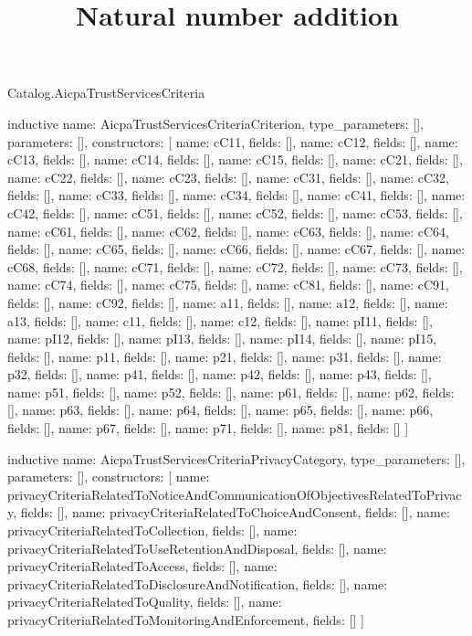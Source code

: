 \begin{lexlean}{Catalog.AicpaTrustServicesCriteria}
\title{Natural number addition}
\begin{semanticmodule}
inductive{
  name: AicpaTrustServicesCriteriaCriterion,
  type_parameters: [],
  parameters: [],
  constructors: [
    {name: cC11, fields: []},
    {name: cC12, fields: []},
    {name: cC13, fields: []},
    {name: cC14, fields: []},
    {name: cC15, fields: []},
    {name: cC21, fields: []},
    {name: cC22, fields: []},
    {name: cC23, fields: []},
    {name: cC31, fields: []},
    {name: cC32, fields: []},
    {name: cC33, fields: []},
    {name: cC34, fields: []},
    {name: cC41, fields: []},
    {name: cC42, fields: []},
    {name: cC51, fields: []},
    {name: cC52, fields: []},
    {name: cC53, fields: []},
    {name: cC61, fields: []},
    {name: cC62, fields: []},
    {name: cC63, fields: []},
    {name: cC64, fields: []},
    {name: cC65, fields: []},
    {name: cC66, fields: []},
    {name: cC67, fields: []},
    {name: cC68, fields: []},
    {name: cC71, fields: []},
    {name: cC72, fields: []},
    {name: cC73, fields: []},
    {name: cC74, fields: []},
    {name: cC75, fields: []},
    {name: cC81, fields: []},
    {name: cC91, fields: []},
    {name: cC92, fields: []},
    {name: a11, fields: []},
    {name: a12, fields: []},
    {name: a13, fields: []},
    {name: c11, fields: []},
    {name: c12, fields: []},
    {name: pI11, fields: []},
    {name: pI12, fields: []},
    {name: pI13, fields: []},
    {name: pI14, fields: []},
    {name: pI15, fields: []},
    {name: p11, fields: []},
    {name: p21, fields: []},
    {name: p31, fields: []},
    {name: p32, fields: []},
    {name: p41, fields: []},
    {name: p42, fields: []},
    {name: p43, fields: []},
    {name: p51, fields: []},
    {name: p52, fields: []},
    {name: p61, fields: []},
    {name: p62, fields: []},
    {name: p63, fields: []},
    {name: p64, fields: []},
    {name: p65, fields: []},
    {name: p66, fields: []},
    {name: p67, fields: []},
    {name: p71, fields: []},
    {name: p81, fields: []}
  ]
}

inductive{
  name: AicpaTrustServicesCriteriaPrivacyCategory,
  type_parameters: [],
  parameters: [],
  constructors: [
    {name: privacyCriteriaRelatedToNoticeAndCommunicationOfObjectivesRelatedToPrivacy, fields: []},
    {name: privacyCriteriaRelatedToChoiceAndConsent, fields: []},
    {name: privacyCriteriaRelatedToCollection, fields: []},
    {name: privacyCriteriaRelatedToUseRetentionAndDisposal, fields: []},
    {name: privacyCriteriaRelatedToAccess, fields: []},
    {name: privacyCriteriaRelatedToDisclosureAndNotification, fields: []},
    {name: privacyCriteriaRelatedToQuality, fields: []},
    {name: privacyCriteriaRelatedToMonitoringAndEnforcement, fields: []}
  ]
}


\end{semanticmodule}
\end{lexlean}
